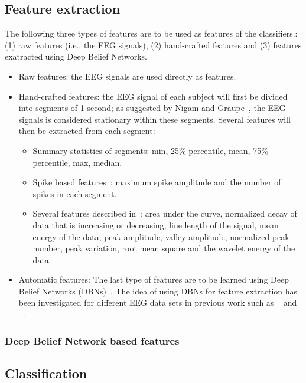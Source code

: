 \documentclass[12pt]{article}
\begin{document}
\subsection{Feature extraction}
The following three types of features are to be used as features of the classifiers.: (1) raw features (i.e., the EEG signals), (2) hand-crafted features and (3) features exatracted using Deep Belief Networks.

\begin{itemize}

\item Raw features: the EEG signals are used directly as features.

\item Hand-crafted features: the EEG signal of each subject will first be divided into segments of 1 second; as suggested by Nigam and Graupe~\cite{nigam2004neural}, the EEG signals is considered stationary within these segments. Several features will then be extracted from each segment:
      \begin{itemize}
      \item Summary statistics of segments: min, 25\% percentile, mean, 75\% percentile, max, median.
      \item Spike based features~\cite{nigam2004neural}: maximum spike amplitude and the number of spikes in each segment.
      \item Several features described in~\cite{wulsin2011modeling}: area under the curve, normalized decay of data that is increasing or decreasing, line length of the signal, mean energy of the data, peak amplitude, valley amplitude, normalized peak number, peak variation, root mean square and the wavelet energy of the data.
      \end{itemize}

\item Automatic features: The last type of features are to be learned using Deep Belief Networks (DBNs)~\cite{hinton2006reducing}. The idea of using DBNs for feature extraction has been investigated for different EEG data sets in previous work such as ~\cite{langkvist2012sleep} and ~\cite{wulsin2011modeling}.

\end{itemize}
\subsubsection{Deep Belief Network based features}

\subsection{Classification}
\end{document}
